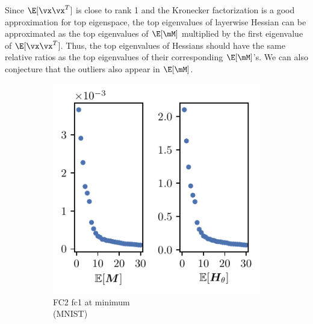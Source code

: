Since $\E[\vx\vx^T]$ is close to rank 1 and the Kronecker factorization is a good approximation for top eigenspace, the top eigenvalues of layerwise Hessian can be approximated as the top eigenvalues of $\E[\mM]$ multiplied by the first eigenvalue of $\E[\vx\vx^T]$. Thus, the top eigenvalues of Hessians should have the same relative ratios as the top eigenvalues of their corresponding $\E[\mM]$'s. We can also conjecture that the outliers also appear in $\E[\mM]$.

\begin{figure}[th]
    \centering
    \begin{subfigure}[b]{0.32\textwidth}
        \centering
        \captionsetup{justification=centering}
        \includegraphics[width=\textwidth]{Figures/EM_vs_H/FC2_MNIST/UTAU_vs_full_sigval_d30_MNIST_Exp1_FC2_fixlr0.01R1_E-1_fc1.pdf}
        \caption{FC2 fc1 at minimum\\(MNIST)}
        \label{fig:UTAU_H_spec_FC2}
    \end{subfigure}\hfill
    \begin{subfigure}[b]{0.32\textwidth}
        \centering
        \captionsetup{justification=centering}

\end{subfigure}
\end{figure}
